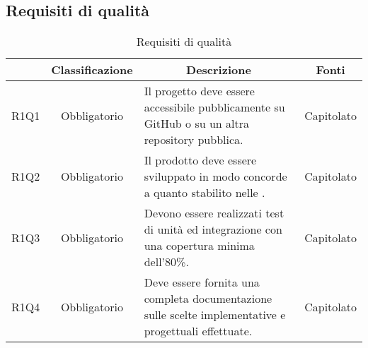 \subsection{Requisiti di qualità} \label{subsection:requisiti_qualita}
\begin{table}[H]
    \centering
    \renewcommand{\arraystretch}{1.8}
    \begin{tabular}{c | c | p{6cm} | c}
        \rowcolor[HTML]{125E28}
        \multicolumn{1}{c}{\color[HTML]{FFFFFF} \textbf{Codice}}          &
        \multicolumn{1}{c}{\color[HTML]{FFFFFF} \textbf{Classificazione}} &
        \multicolumn{1}{c}{\color[HTML]{FFFFFF} \textbf{Descrizione}}     &
        \multicolumn{1}{c}{\color[HTML]{FFFFFF} \textbf{Fonti}}                                                                                                                                                    \\
        \hline
        R1Q1                                                              & Obbligatorio & Il progetto deve essere accessibile pubblicamente su GitHub\glo{} o su un altra repository\glo{} pubblica. & Capitolato \\
        R1Q2                                                              & Obbligatorio & Il prodotto deve essere sviluppato in modo concorde a quanto stabilito nelle \docNameNdP{}.                & Capitolato \\
        R1Q3                                                              & Obbligatorio & Devono essere realizzati test di unità ed integrazione con una copertura minima dell'80\%.                 & Capitolato \\
        R1Q4                                                              & Obbligatorio & Deve essere fornita una completa documentazione sulle scelte implementative e progettuali effettuate.      & Capitolato \\
    \end{tabular}
    \caption{Requisiti di qualità}
\end{table}

